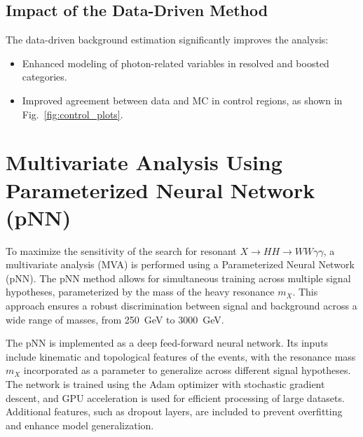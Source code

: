 \subsection{Impact of the Data-Driven Method}
The data-driven background estimation significantly improves the analysis:
\begin{itemize}
    \item Enhanced modeling of photon-related variables in resolved and boosted categories.
    \item Improved agreement between data and MC in control regions, as shown in Fig.~\ref{fig:control_plots}.
    \label{fig:control_plots}
\end{itemize}

\section{Multivariate Analysis Using Parameterized Neural Network (pNN)}

To maximize the sensitivity of the search for resonant \(X \to HH \to WW\gamma\gamma\), a multivariate analysis (MVA) is performed
using a Parameterized Neural Network (pNN). The pNN method allows for simultaneous training across multiple signal hypotheses,
parameterized by the mass of the heavy resonance \(m_X\). This approach ensures a robust discrimination between signal and
background across a wide range of masses, from 250~GeV to 3000~GeV.

The pNN is implemented as a deep feed-forward neural network. Its inputs include kinematic and topological features of the events, with the resonance mass \(m_X\) incorporated as a parameter to generalize across different signal hypotheses. The network is trained using the Adam optimizer with stochastic gradient descent, and GPU acceleration is used for efficient processing of large datasets. Additional features, such as dropout layers, are included to prevent overfitting and enhance model generalization.

